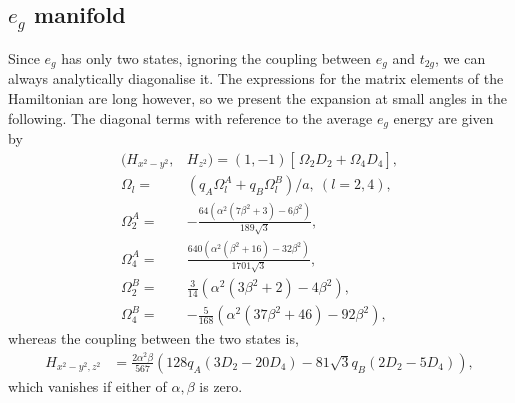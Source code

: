 \documentclass[a4paper,prb,twocolumn]{revtex4-1}  %
\newcommand{\com}[1]{}
\begin{document}
 



\subsection{$e_{g}$ manifold}
\label{sec:eg-gen}


\com{
So we consider the general case of

both theta phi couples the two states..... expressions relatively longer, but, can be approximated by simpler expressions obtained by an expansion about zero angles.... 

simpler expressions of eigenstates and eigenvalues.... in terms of D2 and D4 terms of A and B.

presentation and discussion of eg splitting...
combined plots for the three cases w.r.t  angles... as three  rows
and two q values on the opposite side of the crossover...
so 2x3 panel figure.
}



Since $e_{g}$ has only two states,
ignoring the coupling between $e_{g}$ and $t_{2g}$,
we can always analytically diagonalise it.
The expressions for the
matrix elements of the Hamiltonian are long however,
so we present the expansion at small angles in the following.
The diagonal terms with reference to the average $e_g$ energy are given by
\begin{align}
\label{eq:eg-hiix}
(H_{x^2-y^2},&H_{z^2}) = (1,-1)
\left[\frac{}{} \Omega_{2}  D_2 + \Omega_4 D_4\right],\\
\Omega_{l} =&  \left(q_A \Omega_{l}^A + q_B\Omega_{l}^B\right)/a,~(l=2,4),\\
\Omega_{2}^A =&  -\frac{64 \left(\alpha ^2 \left(7 \beta ^2+3\right)-6 \beta ^2\right)}{189 \sqrt{3}},\\
\Omega_{4}^A =& \frac{640 \left(\alpha ^2 \left(\beta ^2+16\right)-32 \beta ^2\right)}{1701 \sqrt{3}},\\
\Omega_{2}^B =&  \frac{3}{14} \left(\alpha ^2 \left(3 \beta ^2+2\right)-4 \beta ^2\right),\\
\Omega_{4}^B =& -\frac{5}{168}\left(\alpha ^2 \left(37 \beta ^2+46\right)-92 \beta ^2\right),
\end{align}
whereas the coupling between the two states is,
\begin{align}
\label{eq:eg-hijx}
H_{x^2-y^2,z^2}&=
\frac{2\alpha ^2 \beta}{567} 
\left(128 q_A (3 D_2-20 D_4) - 81 \sqrt{3} q_B (2 D_2 -5 D_4)\right),
\end{align}
which vanishes if 
either of $\alpha,\beta$ is zero.
\end{document}
